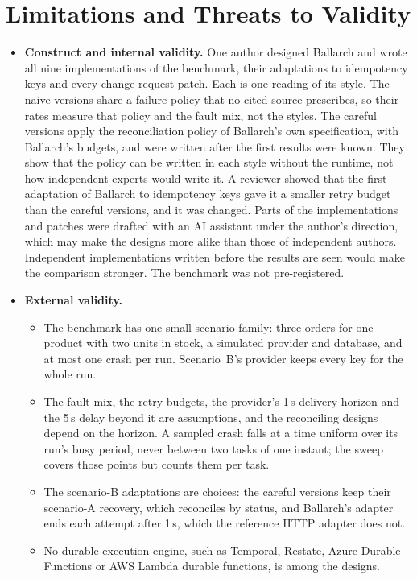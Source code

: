 \documentclass[11pt]{article}
\theoremstyle{definition}
\theoremstyle{plain}
\begin{document}
\section{Limitations and Threats to Validity}

\begin{itemize}[leftmargin=*]
  \item \textbf{Construct and internal validity.} One author designed Ballarch and wrote all nine implementations of the benchmark, their adaptations to idempotency keys and every change-request patch. Each is one reading of its style. The naive versions share a failure policy that no cited source prescribes, so their rates measure that policy and the fault mix, not the styles. The careful versions apply the reconciliation policy of Ballarch's own specification, with Ballarch's budgets, and were written after the first results were known. They show that the policy can be written in each style without the runtime, not how independent experts would write it. A reviewer showed that the first adaptation of Ballarch to idempotency keys gave it a smaller retry budget than the careful versions, and it was changed. Parts of the implementations and patches were drafted with an AI assistant under the author's direction, which may make the designs more alike than those of independent authors. Independent implementations written before the results are seen would make the comparison stronger. The benchmark was not pre-registered.
  \item \textbf{External validity.}
  \begin{itemize}[nosep]
    \item The benchmark has one small scenario family: three orders for one product with two units in stock, a simulated provider and database, and at most one crash per run. Scenario~B's provider keeps every key for the whole run.
    \item The fault mix, the retry budgets, the provider's 1\,s delivery horizon and the 5\,s delay beyond it are assumptions, and the reconciling designs depend on the horizon. A sampled crash falls at a time uniform over its run's busy period, never between two tasks of one instant; the sweep covers those points but counts them per task.
    \item The scenario-B adaptations are choices: the careful versions keep their scenario-A recovery, which reconciles by status, and Ballarch's adapter ends each attempt after 1\,s, which the reference HTTP adapter does not.
    \item No durable-execution engine, such as Temporal, Restate, Azure Durable Functions or AWS Lambda durable functions, is among the designs.

\end{itemize}
\end{itemize}
\end{document}
